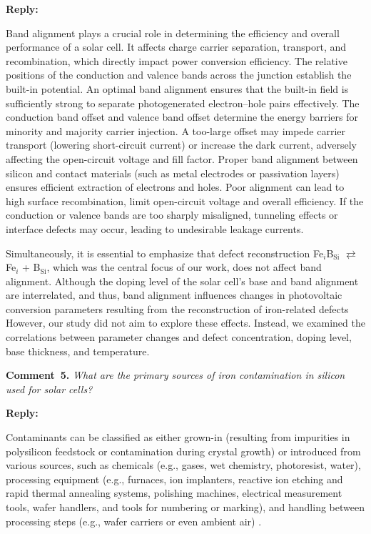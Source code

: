 \documentclass[a4paper,fleqn]{cas-sc}
\begin{document}
\noindent
\textcolor[rgb]{0.51,0.00,0.00}{\textbf{Reply:}}

Band alignment plays a crucial role in determining the efficiency and overall performance of a solar cell.
It affects charge carrier separation, transport, and recombination, which directly impact power conversion efficiency.
The relative positions of the conduction and valence bands across the junction establish the built-in potential.
An optimal band alignment ensures that the built-in field is sufficiently strong to separate photogenerated electron–hole pairs effectively.
The conduction band offset and valence band offset determine the energy barriers for minority and majority carrier injection.
A too-large offset may impede carrier transport (lowering short-circuit current) or increase the dark current,
adversely affecting the open-circuit voltage and fill factor.
Proper band alignment between silicon and contact materials (such as metal electrodes or passivation layers) ensures efficient extraction of electrons and holes.
Poor alignment can lead to high surface recombination, limit open-circuit voltage and overall efficiency.
If the conduction or valence bands are too sharply misaligned, tunneling effects or interface defects may occur,
leading to undesirable leakage currents.

Simultaneously, it is essential to emphasize that defect reconstruction Fe$_i$B$_\mathrm{Si}$ $\rightleftarrows$ Fe$_i$ + B$_\mathrm{Si}$,
which was the central focus of our work,
does not affect band alignment.
Although the doping level of the solar cell's base and band alignment are interrelated,
and thus, band alignment influences changes in photovoltaic conversion parameters resulting from the reconstruction of iron-related defects
However, our study did not aim to explore these effects.
Instead, we examined the correlations between parameter changes and defect concentration, doping level, base thickness, and temperature.



\vspace{1cm}
\noindent
\textcolor[rgb]{0.00,0.50,1.00}{\textbf{Comment~5.}}
\emph{What are the primary sources of iron contamination in silicon used for solar cells?}


\noindent
\textcolor[rgb]{0.51,0.00,0.00}{\textbf{Reply:}}


Contaminants can be classified as either grown-in (resulting from impurities in polysilicon
feedstock or contamination during crystal growth) or introduced from various sources,
such as chemicals (e.g., gases, wet chemistry, photoresist, water),
processing equipment (e.g., furnaces, ion implanters, reactive ion etching and rapid thermal annealing systems,
polishing machines, electrical measurement tools, wafer handlers, and tools for numbering or marking),
and handling between processing steps (e.g., wafer carriers or even ambient air) \cite{Istratov2000}.
\end{document}
